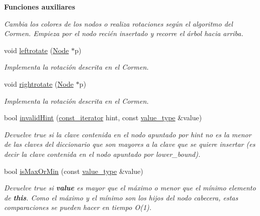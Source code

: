\begin{Indent}{\bf Funciones auxiliares}
\begin{DoxyCompactItemize}
\begin{DoxyCompactList}\small\item\em Cambia los colores de los nodos o realiza rotaciones según el algoritmo del Cormen. Empieza por el nodo recién insertado y recorre el árbol hacia arriba. \end{DoxyCompactList}\item 
void \hyperlink{classaed2_1_1map_ad764851f1534f2db0964c4f729056a1e_ad764851f1534f2db0964c4f729056a1e}{leftrotate} (\hyperlink{structaed2_1_1map_1_1Node}{Node} $\ast$p)
\begin{DoxyCompactList}\small\item\em Implementa la rotación descrita en el Cormen. \end{DoxyCompactList}\item 
void \hyperlink{classaed2_1_1map_a816d69fa4dfe18a984dc3628fee14e2f_a816d69fa4dfe18a984dc3628fee14e2f}{rightrotate} (\hyperlink{structaed2_1_1map_1_1Node}{Node} $\ast$p)
\begin{DoxyCompactList}\small\item\em Implementa la rotación descrita en el Cormen. \end{DoxyCompactList}\item 
bool \hyperlink{classaed2_1_1map_a7403745a296985d64b8666c18953b2c0_a7403745a296985d64b8666c18953b2c0}{invalid\-Hint} (\hyperlink{classaed2_1_1map_1_1const__iterator}{const\-\_\-iterator} hint, const \hyperlink{classaed2_1_1map_a719db98e0ff9a837610f76be33264680_a719db98e0ff9a837610f76be33264680}{value\-\_\-type} \&value)
\begin{DoxyCompactList}\small\item\em Devuelve true si la clave contenida en el nodo apuntado por hint {\itshape  no es } la menor de las claves del diccionario que son mayores a la clave que se quiere insertar (es decir la clave contenida en el nodo apuntado por lower\-\_\-bound). \end{DoxyCompactList}\item 
bool \hyperlink{classaed2_1_1map_a81db4ead6daafe94938d5410173bdb6c_a81db4ead6daafe94938d5410173bdb6c}{is\-Max\-Or\-Min} (const \hyperlink{classaed2_1_1map_a719db98e0ff9a837610f76be33264680_a719db98e0ff9a837610f76be33264680}{value\-\_\-type} \&value)
\begin{DoxyCompactList}\small\item\em Devuelve true si {\bfseries value} es mayor que el máximo o menor que el mínimo elemento de {\bfseries this}. Como el máximo y el mínimo son los hijos del nodo cabecera, estas comparaciones se pueden hacer en tiempo O(1). \end{DoxyCompactList}\item 

\end{DoxyCompactItemize}
\end{Indent}

